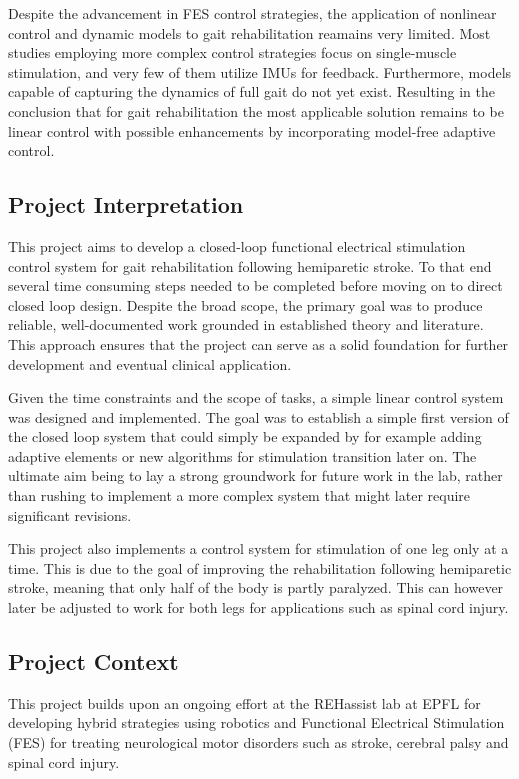 Despite the advancement in FES control strategies, the application of nonlinear control and dynamic models to gait rehabilitation reamains very limited. Most studies employing more complex control strategies focus on single-muscle stimulation, and very few of them utilize IMUs for feedback. Furthermore, models capable of capturing the dynamics of full gait do not yet exist. Resulting in the conclusion that for gait rehabilitation the most applicable solution remains to be linear control with possible enhancements by incorporating model-free adaptive control.

\subsection{Project Interpretation}
This project aims to develop a closed-loop functional electrical stimulation control system for gait rehabilitation following hemiparetic stroke. To that end several time consuming steps needed to be completed before moving on to direct closed loop design. Despite the broad scope, the primary goal was to produce reliable, well-documented work grounded in established theory and literature. This approach ensures that the project can serve as a solid foundation for further development and eventual clinical application.

Given the time constraints and the scope of tasks, a simple linear control system was designed and implemented. The goal was to establish a simple first version of the closed loop system that could simply be expanded by for example adding adaptive elements or new algorithms for stimulation transition later on. The ultimate aim being to lay a strong groundwork for future work in the lab, rather than rushing to implement a more complex system that might later require significant revisions.

This project also implements a control system for stimulation of one leg only at a time. This is due to the goal of improving the rehabilitation following hemiparetic stroke, meaning that only half of the body is partly paralyzed. This can however later be adjusted to work for both legs for applications such as spinal cord injury.



\subsection{Project Context}
This project builds upon an ongoing effort at the REHassist lab at EPFL for developing hybrid strategies using robotics and Functional Electrical Stimulation (FES) for treating neurological motor disorders such as stroke, cerebral palsy and spinal cord injury. 

